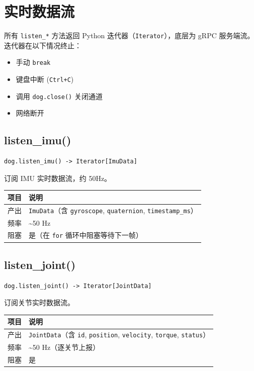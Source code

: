 \documentclass[a4paper,11pt,openany]{book}
\begin{document}
\section{实时数据流}

所有 \texttt{listen\_*} 方法返回 Python 迭代器（\texttt{Iterator}），底层为 gRPC 服务端流。迭代器在以下情况终止：

\begin{itemize}[nosep]
  \item 手动 \texttt{break}
  \item 键盘中断 (\texttt{Ctrl+C})
  \item 调用 \texttt{dog.close()} 关闭通道
  \item 网络断开
\end{itemize}

\subsection{listen\_imu()}

\begin{lstlisting}[style=python,numbers=none]
dog.listen_imu() -> Iterator[ImuData]
\end{lstlisting}

订阅 IMU 实时数据流，约 50Hz。

\begin{longtable}{ll}
\toprule
项目 & 说明 \\
\midrule
\endhead
产出 & \texttt{ImuData}（含 \texttt{gyroscope}, \texttt{quaternion}, \texttt{timestamp\_ms}） \\
频率 & \textasciitilde 50 Hz \\
阻塞 & 是（在 \texttt{for} 循环中阻塞等待下一帧） \\
\bottomrule
\end{longtable}

\subsection{listen\_joint()}

\begin{lstlisting}[style=python,numbers=none]
dog.listen_joint() -> Iterator[JointData]
\end{lstlisting}

订阅关节实时数据流。

\begin{longtable}{ll}
\toprule
项目 & 说明 \\
\midrule
\endhead
产出 & \texttt{JointData}（含 \texttt{id}, \texttt{position}, \texttt{velocity}, \texttt{torque}, \texttt{status}） \\
频率 & \textasciitilde 50 Hz（逐关节上报） \\
阻塞 & 是 \\
\bottomrule
\end{longtable}
\end{document}
